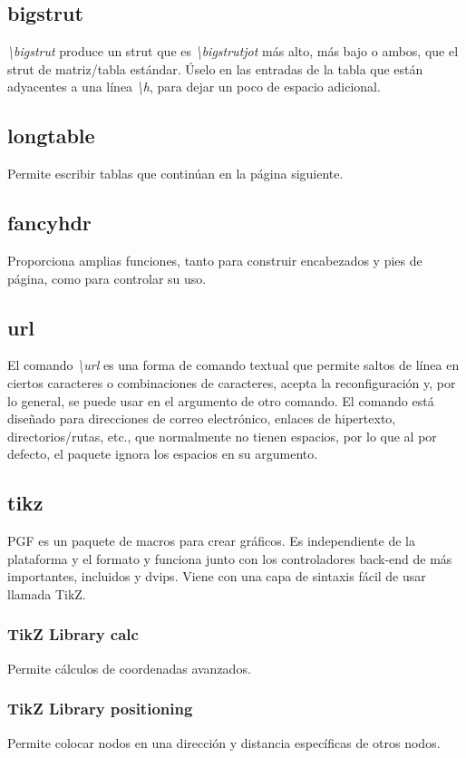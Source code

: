\documentclass[12pt]{article}
\begin{document}
\subsection{bigstrut}
\textit{\textbackslash bigstrut} produce un strut que es \textit{\textbackslash bigstrutjot} más alto, más bajo o ambos, que el strut de matriz/tabla estándar. Úselo en las entradas de la tabla que están adyacentes a una línea \textit{\textbackslash h}, para dejar un poco de espacio adicional.\cite{bigstrut}
\subsection{longtable}
Permite escribir tablas que continúan en la página siguiente.\cite{longtable}
\subsection{fancyhdr}
Proporciona amplias funciones, tanto para construir encabezados y pies de página, como para controlar su uso.\cite{fancyhdr}
\subsection{url}
El comando \textit{\textbackslash url} es una forma de comando textual que permite saltos de línea en ciertos caracteres o combinaciones de caracteres, acepta la reconfiguración y, por lo general, se puede usar en el argumento de otro comando. El comando está diseñado para direcciones de correo electrónico, enlaces de hipertexto, directorios/rutas, etc., que normalmente no tienen espacios, por lo que al por defecto, el paquete ignora los espacios en su argumento.\cite{url}
\subsection{tikz}
PGF es un paquete de macros para crear gráficos. Es independiente de la plataforma y el formato y funciona junto con los controladores back-end de  más importantes, incluidos  y dvips. Viene con una capa de sintaxis fácil de usar llamada TikZ.\cite{tikz}
\subsubsection{TikZ Library calc}
Permite cálculos de coordenadas avanzados.\cite{calc}
\subsubsection{TikZ Library positioning}
Permite colocar nodos en una dirección y distancia específicas de otros nodos.\cite{positioning}
\end{document}
